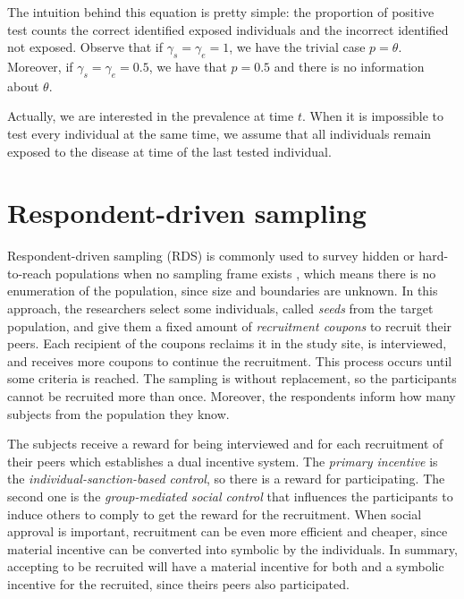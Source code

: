 The intuition behind this equation is pretty simple: the proportion
of positive test counts the correct identified exposed individuals and the
incorrect identified not exposed. Observe that if $\gamma_s = \gamma_e = 1$, we have the trivial case $p =
\theta$. Moreover, if $\gamma_s = \gamma_e = 0.5$, we have that
$p = 0.5$ and there is no information about $\theta$. 

\begin{remark}
  Actually, we are interested in the prevalence at time $t$. When it is 
  impossible to test every individual at the same time, we assume that all
  individuals remain exposed to the disease at time of the last tested individual. 
\end{remark}

\section{Respondent-driven sampling}
\label{sec:respodent_driven_sampling}

Respondent-driven sampling (RDS) is commonly used to survey hidden or hard-to-reach populations when
no sampling frame exists \cite[]{heckathorn1997}, which means there is no
enumeration of the population, since size and boundaries are unknown. In this approach, the
researchers select some individuals, called {\em seeds} from the target
population, and give them a fixed amount of {\em recruitment coupons} to
recruit their peers. Each recipient of the coupons reclaims it in the study
site, is interviewed, and receives more coupons to continue the recruitment.
This process occurs until some criteria is reached. The sampling is without
replacement, so the participants cannot be recruited more than once. Moreover,
the respondents inform how many subjects from the population they know.

The subjects receive a reward for being interviewed and for each recruitment
of their peers which establishes a dual incentive system. The {\em primary incentive} is the
{\em individual-sanction-based control}, so there is a reward for
participating. The second one is the {\em group-mediated social control} that
influences the participants to induce others to comply to get the reward for the recruitment. When social approval is important, recruitment can be even
more efficient and cheaper, since material incentive can be converted into
symbolic by the individuals. In summary, accepting to be recruited will have a
material incentive for both and a symbolic incentive for the recruited, since
theirs peers also participated.

